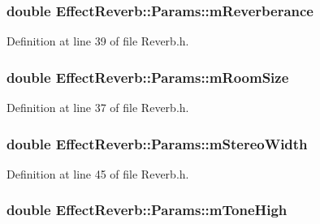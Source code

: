 \subsubsection[{\texorpdfstring{m\+Reverberance}{mReverberance}}]{\setlength{\rightskip}{0pt plus 5cm}double Effect\+Reverb\+::\+Params\+::m\+Reverberance}\hypertarget{struct_effect_reverb_1_1_params_a6cdc77131f7d1f31d2d69a66c4b1522d}{}\label{struct_effect_reverb_1_1_params_a6cdc77131f7d1f31d2d69a66c4b1522d}


Definition at line 39 of file Reverb.\+h.

\subsubsection[{\texorpdfstring{m\+Room\+Size}{mRoomSize}}]{\setlength{\rightskip}{0pt plus 5cm}double Effect\+Reverb\+::\+Params\+::m\+Room\+Size}\hypertarget{struct_effect_reverb_1_1_params_a35e1b6bde11b18da2108e41537c39793}{}\label{struct_effect_reverb_1_1_params_a35e1b6bde11b18da2108e41537c39793}


Definition at line 37 of file Reverb.\+h.

\subsubsection[{\texorpdfstring{m\+Stereo\+Width}{mStereoWidth}}]{\setlength{\rightskip}{0pt plus 5cm}double Effect\+Reverb\+::\+Params\+::m\+Stereo\+Width}\hypertarget{struct_effect_reverb_1_1_params_a20ec793e1906f32570f3bed500c3f5f5}{}\label{struct_effect_reverb_1_1_params_a20ec793e1906f32570f3bed500c3f5f5}


Definition at line 45 of file Reverb.\+h.

\subsubsection[{\texorpdfstring{m\+Tone\+High}{mToneHigh}}]{\setlength{\rightskip}{0pt plus 5cm}double Effect\+Reverb\+::\+Params\+::m\+Tone\+High}\hypertarget{struct_effect_reverb_1_1_params_a730ddc43499661170e0f8cdc7af603ca}{}\label{struct_effect_reverb_1_1_params_a730ddc43499661170e0f8cdc7af603ca}


